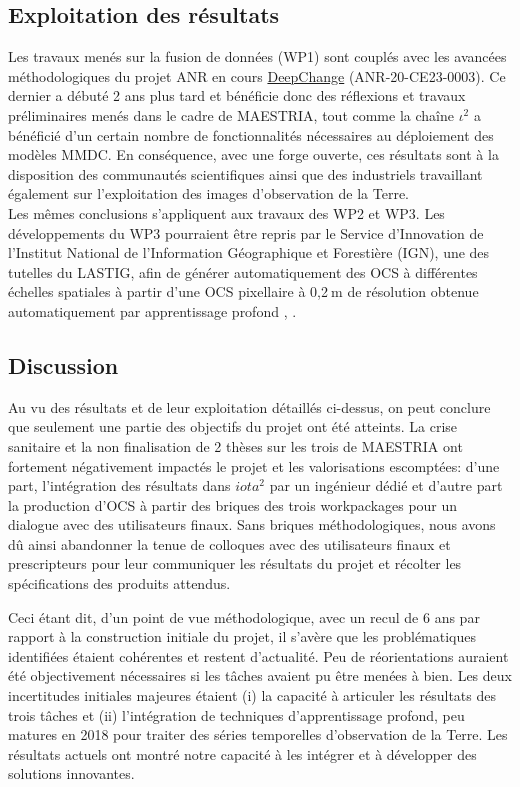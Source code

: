 \subsection{Exploitation des résultats}
Les travaux menés sur la fusion de données (WP1) sont couplés avec les avancées méthodologiques du projet ANR en cours \href{https://anr.hal.science/search/index/?q=*&anrProjectReference_s=ANR-20-CE23-0003}{DeepChange} (ANR-20-CE23-0003). Ce dernier a débuté 2 ans plus tard et bénéficie donc des réflexions et travaux préliminaires menés dans le cadre de MAESTRIA, tout comme la chaîne $\iota^2$ a bénéficié d'un certain nombre de fonctionnalités nécessaires au déploiement des modèles MMDC. En conséquence, avec une forge ouverte, ces résultats sont à la disposition des communautés scientifiques ainsi que des industriels travaillant également sur l'exploitation des images d'observation de la Terre.\\
Les mêmes conclusions s'appliquent aux travaux des WP2 et WP3. Les développements du WP3 pourraient être repris par le Service d'Innovation de l'Institut National de l'Information Géographique et Forestière (IGN), une des tutelles du LASTIG, afin de générer automatiquement des OCS à différentes échelles spatiales à partir d'une OCS pixellaire à 0,2$\:$m de résolution obtenue automatiquement par apprentissage profond \cite{garioud2023flair}, \cite{garioud2023flair2}.


\subsection{Discussion} 
Au vu des résultats et de leur exploitation détaillés ci-dessus, on peut conclure que seulement une partie des objectifs du projet ont été atteints. La crise sanitaire et la non finalisation de 2 thèses sur les trois de MAESTRIA ont fortement négativement impactés le projet et les valorisations escomptées: d'une part, l'intégration des résultats dans $iota^2$ par un ingénieur dédié et d'autre part la production d'OCS à partir des briques des trois workpackages pour un dialogue avec des utilisateurs finaux. Sans briques méthodologiques, nous avons dû ainsi abandonner la tenue de colloques avec des utilisateurs finaux et prescripteurs pour leur communiquer les résultats du projet et récolter les spécifications des produits attendus. 

Ceci étant dit, d'un point de vue méthodologique, avec un recul de 6 ans par rapport à la construction initiale du projet, il s'avère que les problématiques identifiées étaient cohérentes et restent d'actualité. Peu de réorientations auraient été objectivement nécessaires si les tâches avaient pu être menées à bien. Les deux incertitudes initiales majeures étaient (i) la capacité à articuler les résultats des trois tâches et (ii) l'intégration de techniques d'apprentissage profond, peu matures en 2018 pour traiter des séries temporelles d'observation de la Terre. Les résultats actuels ont montré notre capacité à les intégrer et à développer des solutions innovantes.

